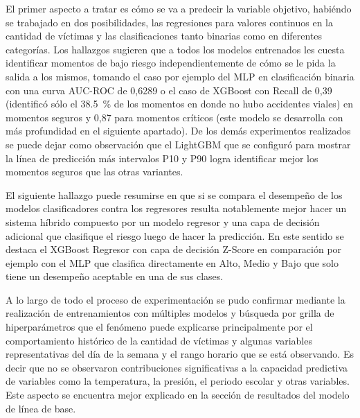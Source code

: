 El primer aspecto a tratar es cómo se va a predecir la variable objetivo, habiéndo se trabajado en dos posibilidades, las regresiones para valores continuos en la cantidad de víctimas y las clasificaciones tanto binarias como en diferentes categorías. Los hallazgos sugieren que a todos los modelos entrenados les cuesta identificar momentos de bajo riesgo independientemente de cómo se le pida la salida a los mismos, tomando el caso por ejemplo del MLP en clasificación binaria con una curva AUC-ROC de 0,6289 o el caso de XGBoost con Recall de 0,39 (identificó sólo el \qty{38.5}{\percent} de los momentos en donde no hubo accidentes viales) en momentos seguros y 0,87 para momentos críticos (este modelo se desarrolla con más profundidad en el siguiente apartado). De los demás experimentos realizados se puede dejar como observación que el LightGBM que se configuró para mostrar la línea de predicción más intervalos P10 y P90 logra identificar mejor los momentos seguros que las otras variantes.

El siguiente hallazgo puede resumirse en que si se compara el desempeño de los modelos clasificadores contra los regresores resulta notablemente mejor hacer un sistema híbrido compuesto por un modelo regresor y una capa de decisión adicional que clasifique el riesgo luego de hacer la predicción. En este sentido se destaca el XGBoost Regresor con capa de decisión Z-Score en comparación por ejemplo con el MLP que clasifica directamente en Alto, Medio y Bajo que solo tiene un desempeño aceptable en una de sus clases.

A lo largo de todo el proceso de experimentación se pudo confirmar mediante la realización de entrenamientos con múltiples modelos y búsqueda por grilla de hiperparámetros que el fenómeno puede explicarse principalmente por el comportamiento histórico de la cantidad de víctimas y algunas variables representativas del día de la semana y el rango horario que se está observando. Es decir que no se observaron contribuciones significativas a la capacidad predictiva de variables como la temperatura, la presión, el periodo escolar y otras variables. Este aspecto se encuentra mejor explicado en la sección de resultados del modelo de línea de base.

